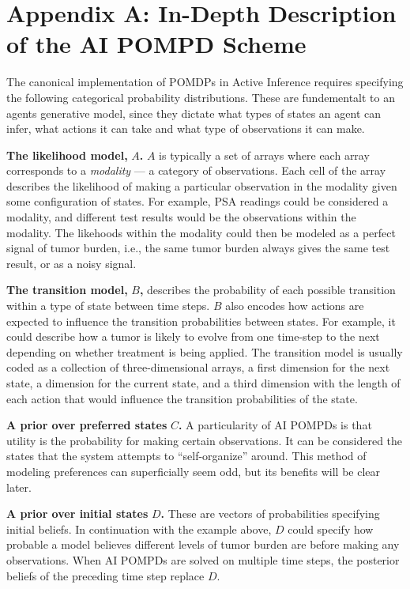 \documentclass[
]{article}
\begin{document}
\section{Appendix A: In-Depth Description of the AI POMPD
Scheme}\label{appendix-a-in-depth-description-of-the-ai-pompd-scheme}

The canonical implementation of POMDPs in Active Inference requires
specifying the following categorical probability distributions. These
are fundementalt to an agents generative model, since they dictate what
types of states an agent can infer, what actions it can take and what
type of observations it can make.

\textbf{The likelihood model,} \(A\)\textbf{.} \(A\) is typically a set
of arrays where each array corresponds to a \emph{modality} --- a
category of observations. Each cell of the array describes the
likelihood of making a particular observation in the modality given some
configuration of states. For example, PSA readings could be considered a
modality, and different test results would be the observations within
the modality. The likehoods within the modality could then be modeled as
a perfect signal of tumor burden, i.e., the same tumor burden always
gives the same test result, or as a noisy signal.

\textbf{The transition model,} \(B\)\textbf{,} describes the probability
of each possible transition within a type of state between time steps.
\(B\) also encodes how actions are expected to influence the transition
probabilities between states. For example, it could describe how a tumor
is likely to evolve from one time-step to the next depending on whether
treatment is being applied. The transition model is usually coded as a
collection of three-dimensional arrays, a first dimension for the next
state, a dimension for the current state, and a third dimension with the
length of each action that would influence the transition probabilities
of the state.

\textbf{A prior over preferred states} \(C\)\textbf{.} A particularity
of AI POMPDs is that utility is the probability for making certain
observations. It can be considered the states that the system attempts
to ``self-organize'' around. This method of modeling preferences can
superficially seem odd, but its benefits will be clear later.

\textbf{A prior over initial states} \(D\)\textbf{.} These are vectors
of probabilities specifying initial beliefs. In continuation with the
example above, \(D\) could specify how probable a model believes
different levels of tumor burden are before making any observations.
When AI POMPDs are solved on multiple time steps, the posterior beliefs
of the preceding time step replace \(D\).
\end{document}
